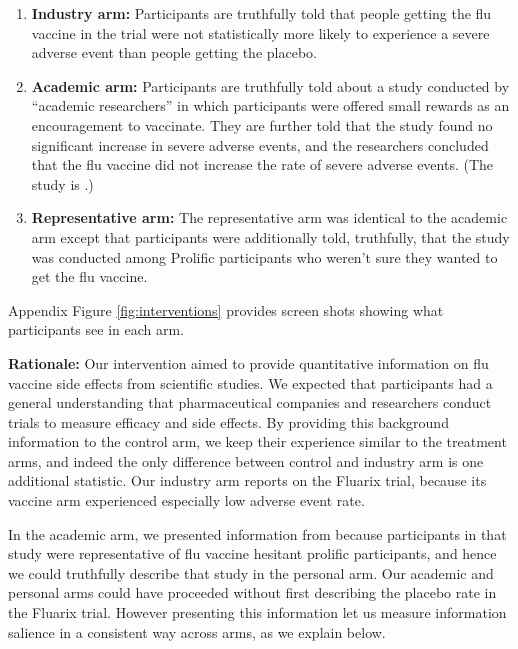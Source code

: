 \begin{enumerate}
  \item \textbf{Industry arm:} Participants are truthfully told that people getting the flu 
  vaccine in the trial were not statistically more likely to experience a severe adverse 
  event than people getting the placebo. 

  \item \textbf{Academic arm:} Participants are truthfully told about a study conducted 
  by “academic researchers” in which participants were offered small rewards as an 
  encouragement to vaccinate.  They are further told that the study found no significant 
  increase in severe adverse events, and the researchers concluded that the flu vaccine 
  did not increase the rate of severe adverse events. 
  (The study is \citet{sacks2025preferences}.) 

  \item \textbf{Representative arm:} The representative arm was identical to the academic 
  arm except that participants were additionally told, truthfully, that the study was 
  conducted among Prolific participants who weren’t sure they wanted to get the flu vaccine. 
\end{enumerate}
Appendix Figure \ref{fig:interventions} provides screen shots showing what participants see 
in each arm.

\textbf{Rationale:} Our intervention aimed to provide quantitative information on flu vaccine 
side effects from scientific studies. We expected that participants had a general understanding 
that pharmaceutical companies and researchers conduct trials to measure efficacy and side 
effects. By providing this background information to the control arm, we keep their experience 
similar  to the treatment arms, and indeed the only difference between control and industry 
arm is one additional statistic. Our industry arm reports on the Fluarix trial, because 
its vaccine arm experienced especially low adverse event rate. 

In the academic arm, we presented information from \citet{sacks2025preferences} because 
participants in that study were representative of flu vaccine hesitant prolific participants, 
and hence we could truthfully describe that study in the personal arm. Our academic and 
personal arms could have proceeded without first describing the placebo rate in the 
Fluarix trial. However presenting this information let us measure information salience 
in a consistent way across arms, as we explain below. 

